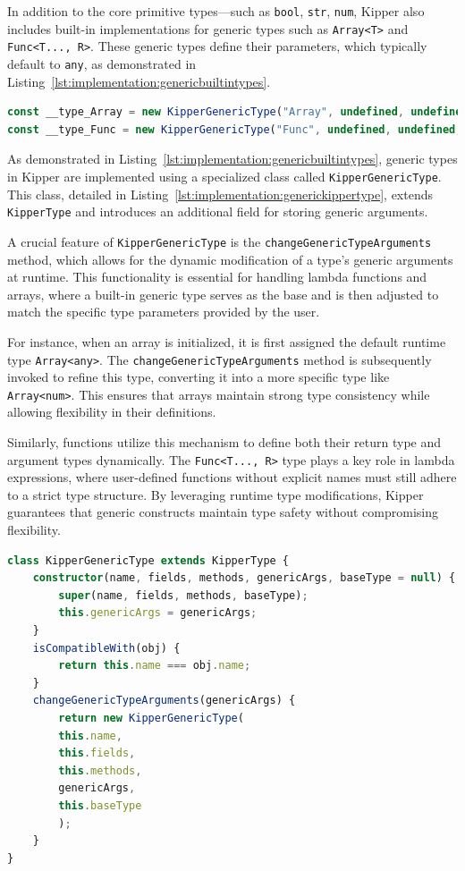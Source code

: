 In addition to the core primitive types—such as \lstinline|bool|, \lstinline|str|, \lstinline|num|, Kipper also includes built-in implementations for generic types such as \lstinline|Array<T>| and \lstinline|Func<T..., R>|. These generic types define their parameters, which typically default to \lstinline|any|, as demonstrated in Listing~\ref{lst:implementation:genericbuiltintypes}.

\begin{lstlisting}[language=Typescript,caption=Generic built-in types,label=lst:implementation:genericbuiltintypes]
const __type_Array = new KipperGenericType("Array", undefined, undefined, {T: __type_any});
const __type_Func = new KipperGenericType("Func", undefined, undefined, {T: [], R: __type_any});
\end{lstlisting}

As demonstrated in Listing~\ref{lst:implementation:genericbuiltintypes}, generic types in Kipper are implemented using a specialized class called \lstinline|KipperGenericType|. This class, detailed in Listing~\ref{lst:implementation:generickippertype}, extends \lstinline|KipperType| and introduces an additional field for storing generic arguments.

A crucial feature of \lstinline|KipperGenericType| is the \lstinline|changeGenericTypeArguments| method, which allows for the dynamic modification of a type's generic arguments at runtime. This functionality is essential for handling lambda functions and arrays, where a built-in generic type serves as the base and is then adjusted to match the specific type parameters provided by the user.

For instance, when an array is initialized, it is first assigned the default runtime type \lstinline|Array<any>|. The \lstinline|changeGenericTypeArguments| method is subsequently invoked to refine this type, converting it into a more specific type like \lstinline|Array<num>|. This ensures that arrays maintain strong type consistency while allowing flexibility in their definitions.

Similarly, functions utilize this mechanism to define both their return type and argument types dynamically. The \lstinline|Func<T..., R>| type plays a key role in lambda expressions, where user-defined functions without explicit names must still adhere to a strict type structure. By leveraging runtime type modifications, Kipper guarantees that generic constructs maintain type safety without compromising flexibility.

\begin{lstlisting}[language=Typescript,caption=Generic Kipper Type,label=lst:implementation:generickippertype]
class KipperGenericType extends KipperType {
	constructor(name, fields, methods, genericArgs, baseType = null) {
		super(name, fields, methods, baseType);
		this.genericArgs = genericArgs;
	}
	isCompatibleWith(obj) {
		return this.name === obj.name;
	}
	changeGenericTypeArguments(genericArgs) {
		return new KipperGenericType(
		this.name,
		this.fields,
		this.methods,
		genericArgs,
		this.baseType
		);
	}
}
\end{lstlisting}

